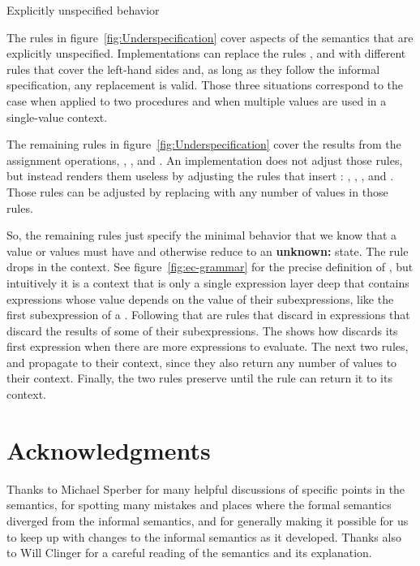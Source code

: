 \beginfig
\begin{center}

\end{center}
\caption{Explicitly unspecified behavior}\label{fig:Underspecification}
\endfig

The rules in figure~\ref{fig:Underspecification} cover aspects of the
semantics that are explicitly unspecified. Implementations can replace
the rules ,  and with different rules that cover the left-hand sides and, as long as they follow the informal specification, any replacement is valid. Those three situations correspond to the case when  applied to two procedures and when multiple values are used in a single-value context.

The remaining rules in figure~\ref{fig:Underspecification} cover the results from the assignment operations, , , and . An implementation does not adjust those rules, but instead renders them useless by adjusting the rules that insert : , , , and . Those rules can be adjusted by replacing  with any number of values in those rules.

So, the remaining rules just specify the minimal behavior that we know that a value or values must have and otherwise reduce to an \textbf{unknown:} state. The rule  drops  in the  context. See figure~\ref{fig:ec-grammar} for the precise definition of , but intuitively it is a context that is only a single expression layer deep that contains expressions whose value depends on the value of their subexpressions, like the first subexpression of a . Following that are rules that discard  in expressions that discard the results of some of their subexpressions. The  shows how  discards its first expression when there are more expressions to evaluate. The next two rules,  and  propagate  to their context, since they also return any number of values to their context. Finally, the two  rules preserve  until the rule  can return it to its context.

\section*{Acknowledgments}

Thanks to Michael Sperber for many helpful discussions of specific points in the semantics, for spotting many mistakes and places where the formal semantics diverged from the informal semantics, and for generally making it possible for us to keep up with changes to the informal semantics as it developed. Thanks also to Will Clinger for a careful reading of the semantics and its explanation.

